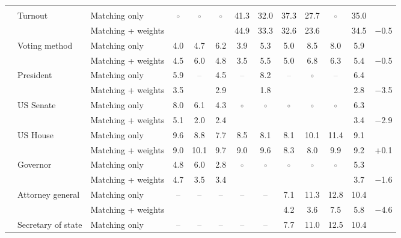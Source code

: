 \begin{table}[!htbp]
{\begin{threeparttable}
\begin{tabular}{llcccccccccc}
\addlinespace[0.3em]
\multicolumn{12}{l}{Non-demographic} \\
\addlinespace[0.1em]
~~Turnout & Matching only & \textcolor{gray}{$\circ$} & \textcolor{gray}{$\circ$} & \textcolor{gray}{$\circ$} & 41.3 & 32.0 & 37.3 & 27.7 & \textcolor{gray}{$\circ$} & 35.0 & \\
 & Matching + weights &  &  &  & 44.9 & 33.3 & 32.6 & 23.6 &  & 34.5 & $-$0.5 \\
\addlinespace[0.1em]
~~Voting method & Matching only & 4.0 & 4.7 & 6.2 & 3.9 & 5.3 & 5.0 & 8.5 & 8.0 & 5.9 & \\
 & Matching + weights & 4.5 & 6.0 & 4.8 & 3.5 & 5.5 & 5.0 & 6.8 & 6.3 & 5.4 & $-$0.5 \\
\addlinespace[0.1em]
~~President & Matching only & 5.9 & \textcolor{gray}{--} & 4.5 & \textcolor{gray}{--} & 8.2 & \textcolor{gray}{--} & \textcolor{gray}{$\circ$} & \textcolor{gray}{--} & 6.4 & \\
 & Matching + weights & 3.5 &  & 2.9 &  & 1.8 &  &  &  & 2.8 & $-$3.5 \\
\addlinespace[0.1em]
~~US Senate & Matching only & 8.0 & 6.1 & 4.3 & \textcolor{gray}{$\circ$} & \textcolor{gray}{$\circ$} & \textcolor{gray}{$\circ$} & \textcolor{gray}{$\circ$} & \textcolor{gray}{$\circ$} & 6.3 & \\
 & Matching + weights & 5.1 & 2.0 & 2.4 &  &  &  &  &  & 3.4 & $-$2.9 \\
\addlinespace[0.1em]
~~US House & Matching only & 9.6 & 8.8 & 7.7 & 8.5 & 8.1 & 8.1 & 10.1 & 11.4 & 9.1 & \\
 & Matching + weights & 9.0 & 10.1 & 9.7 & 9.0 & 9.6 & 8.3 & 8.0 & 9.9 & 9.2 & +0.1 \\
\addlinespace[0.1em]
~~Governor & Matching only & 4.8 & 6.0 & 2.8 & \textcolor{gray}{$\circ$} & \textcolor{gray}{$\circ$} & \textcolor{gray}{$\circ$} & \textcolor{gray}{$\circ$} & \textcolor{gray}{$\circ$} & 5.3 & \\
 & Matching + weights & 4.7 & 3.5 & 3.4 &  &  &  &  &  & 3.7 & $-$1.6 \\
\addlinespace[0.1em]
~~Attorney general & Matching only & \textcolor{gray}{--} & \textcolor{gray}{--} & \textcolor{gray}{--} & \textcolor{gray}{--} & \textcolor{gray}{--} & 7.1 & 11.3 & 12.8 & 10.4 & \\
 & Matching + weights &  &  &  &  &  & 4.2 & 3.6 & 7.5 & 5.8 & $-$4.6 \\
\addlinespace[0.1em]
~~Secretary of state & Matching only & \textcolor{gray}{--} & \textcolor{gray}{--} & \textcolor{gray}{--} & \textcolor{gray}{--} & \textcolor{gray}{--} & 7.7 & 11.0 & 12.5 & 10.4 & \\

\end{tabular}
\end{threeparttable}}
\end{table}
